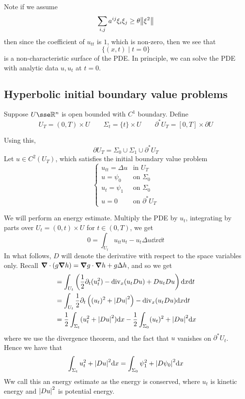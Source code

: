 \documentclass{article}
\begin{document}
Note if we assume
\[\sum_{i, j}a^{ij}\xi_i\xi_j \ge \theta\norm{\xi^2}\]
then since the coefficient of \(u_{tt}\) is \(1\), which is non-zero, then we see that
\[\{(x, t) \mid t = 0\}\]
is a non-characteristic surface of the PDE. In principle, we can solve the PDE with analytic data \(u, u_t\) at \(t = 0\).

\subsection{Hyperbolic initial boundary value problems}

Suppose \(U \sse \R^n\) is open bounded with \(C^1\) boundary. Define
\[U_T = (0, T) \times U \qquad \Sigma_t = \{t\} \times U \qquad \partial^*U_T = [0, T] \times \partial U\]

Using this,
\[\partial U_T = \Sigma_0 \cup \Sigma_1 \cup \partial^*U_T\]
Let \(u \in C^2(U_T)\), which satisfies the initial boundary value problem
\[\begin{cases}
    u_{tt} = \Delta u & \text{in }U_T \\
    u = \psi_0 & \text{on }\Sigma_0 \\
    u_t = \psi_1 & \text{on }\Sigma_0 \\
    u = 0 & \text{on }\partial^*U_T
\end{cases}\]

We will perform an energy estimate. Multiply the PDE by \(u_t\), integrating by parts over \(U_t = (0, t) \times U\) for \(t \in (0, T)\), we get
\[0 = \int_{U_t}u_{tt}u_t - u_t \Delta u \dd x \dd t\]
In what follows, \(D\) will denote the derivative with respect to the space variables only. Recall \(\grad \cdot (g \grad h) = \grad g \cdot \grad h + g \Delta h\), and so we get
\begin{align*}
    &= \int_{U_t}\left(\frac{1}{2}\partial_t(u_t^2) - \mathrm{div}_x(u_tDu) + Du_t Du\right) \dd x \dd t \\
    &= \int_{U_t}\frac{1}{2}\partial_t\left((u_t)^2 + \abs{Du}^2\right) - \mathrm{div}_x(u_tDu) \dd x \dd t \\
    &= \frac{1}{2}\int_{\Sigma_t}(u_t^2 + \abs{Du}^2)\dd x - \frac{1}{2}\int_{\Sigma_0}(u_t)^2 + \abs{Du}^2 \dd x
\end{align*}
where we use the divergence theorem, and the fact that \(u\) vanishes on \(\partial^*U_t\). Hence we have that
\[\int_{\Sigma_t}u_t^2 + \abs{Du}^2 \dd x = \int_{\Sigma_0} \psi_1^2 + \abs{D\psi_0}^2 \dd x\]
Ww call this an energy estimate as the energy is conserved, where \(u_t\) is kinetic energy and \(\abs{Du}^2\) is potential energy.
\end{document}
